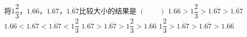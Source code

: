 将$1\dfrac {2}{3}$，$1.66$，$1.6\dot{7}$，$1.\dot{6}\dot{7}$比较大小的结果是
\hfill$\left(\qquad\right)$\fourchoices
{$1.66>1\dfrac {2}{3}>1.6\dot{7}>1.\dot{6}\dot{7}$}
{$1.66<1.6\dot{7}<1.\dot{6}\dot{7}<1\dfrac {2}{3}$}
{$1.6\dot{7}>1.\dot{6}\dot{7}>1\dfrac {2}{3}>1.66$}
{$1\dfrac {2}{3}>1.\dot{6}\dot{7}>1.6\dot{7}>1.66$}